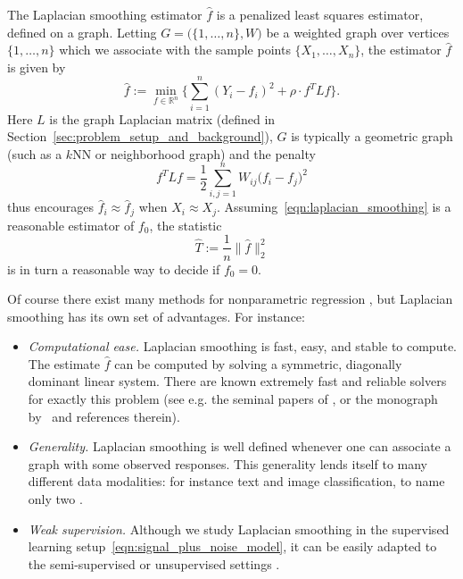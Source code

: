\documentclass[twoside]{article}
\newcommand{\Reals}{\mathbb{R}}
\newcommand{\1}{\mathbf{1}}
\newcommand{\Lap}{L}
\newcommand{\wh}[1]{\widehat{#1}}
\theoremstyle{definition}
\theoremstyle{remark}
\begin{document}
The Laplacian smoothing estimator $\wh{f}$ \citep{smola2003} is a penalized least squares estimator, defined on a graph. Letting $G = \bigl(\{1,\ldots,n\},W\bigr)$ be a weighted graph over vertices $\{1,\ldots,n\}$ which we associate with the sample points $\{X_1,\ldots,X_n\}$, the estimator $\wh{f}$ is given by
\begin{equation}
\label{eqn:laplacian_smoothing}
\wh{f} :=  \min_{f \in \Reals^n} \biggl\{\sum_{i = 1}^{n}(Y_i - f_i)^2 + \rho \cdot f^T \Lap f \biggr\}.
\end{equation}
Here $\Lap$ is the graph Laplacian matrix (defined in Section~\ref{sec:problem_setup_and_background}), $G$ is typically a geometric graph (such as a $k$NN or neighborhood graph) and the penalty
\begin{equation*}
f^T \Lap f = \frac{1}{2} \sum_{i,j = 1}^{n} W_{ij}\bigl(f_i - f_j\bigr)^2
\end{equation*}
thus encourages $\wh{f}_i \approx \wh{f}_j$ when $X_i \approx X_j$. Assuming~\eqref{eqn:laplacian_smoothing} is a reasonable estimator of $f_0$, the statistic
\begin{equation}
\label{eqn:laplacian_smoothing_test}
\wh{T} := \frac{1}{n}\bigl\|\wh{f}\bigr\|_2^2 
\end{equation}
is in turn a reasonable way to decide if $f_0 = 0$. 

Of course there exist many methods for nonparametric regression \citep{gyorfi2006,wasserman2006,tsybakov2008_book}, but Laplacian smoothing has its own set of advantages. For instance:
\begin{itemize}
	\item \emph{Computational ease.} Laplacian smoothing is fast, easy, and stable to compute. The estimate $\wh{f}$ can be computed by solving a symmetric, diagonally dominant linear system. There are known extremely fast and reliable solvers for exactly this problem (see e.g. the seminal papers of \citet{spielman2011,spielman2013,spielman2014}, or the monograph by~\citet{vishnoi2012} and references therein).
	\item \emph{Generality.} Laplacian smoothing is well defined whenever one can associate a graph with some observed responses. This generality lends itself to many different data modalities: for instance text and image classification, to name only two \citep{kondor2002, belkin03a,belkin2006}. 
	\item \emph{Weak supervision.} Although we study Laplacian smoothing in the supervised learning setup~\eqref{eqn:signal_plus_noise_model}, it can be easily adapted to the semi-supervised or unsupervised settings \citep{nadler09,slepcev17,calder2019b,dunlop2020}.
\end{itemize}
\end{document}

